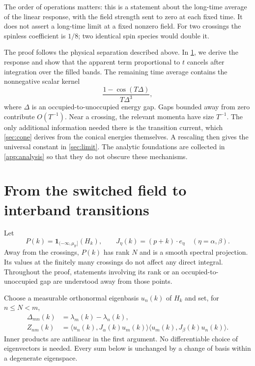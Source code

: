\documentclass[11pt,a4paper]{article}
\newcommand{\ind}{\mathbf 1}
\theoremstyle{remark}
\numberwithin{equation}{section}
\begin{document}
The order of operations matters: this is a statement about the long-time
average of the linear response, with the field strength sent to zero at
each fixed time. It does not assert a long-time limit at a fixed nonzero
field. For two crossings the spinless coefficient is $1/8$; two identical
spin species would double it.

The proof follows the physical separation described above.
In \cref{sec:response}, we derive the response and show that the apparent
term proportional to $t$ cancels after integration over the filled bands.
The remaining time average contains the nonnegative scalar kernel
\[
 \frac{1-\cos(T\Delta)}{T\Delta^3},
\]
where $\Delta$ is an occupied-to-unoccupied energy gap. Gaps bounded away
from zero contribute $O(T^{-1})$. Near a crossing, the relevant momenta
have size $T^{-1}$. The only additional information needed there is the
transition current, which \cref{sec:cone} derives from the conical
energies themselves. A rescaling then gives the universal constant in
\cref{sec:limit}. The analytic foundations are collected in
\cref{app:analysis} so that they do not obscure these mechanisms.

\section{From the switched field to interband transitions}
\label{sec:response}

Let
\[
 P(k)=\ind_{(-\infty,\mu_{\mathrm F}]}(H_k),\qquad
 J_\eta(k)=(p+k)\cdot e_\eta\quad(\eta=\alpha,\beta).
\]
Away from the crossings, $P(k)$ has rank $N$ and is a smooth spectral
projection. Its values at the finitely many crossings do not affect any
direct integral. Throughout the proof, statements involving its rank or
an occupied-to-unoccupied gap are understood away from those points.

Choose a measurable orthonormal eigenbasis $u_n(k)$ of $H_k$ and set, for
$n\leq N<m$,
\begin{equation}
 \begin{split}
 \Delta_{mn}(k)&=\lambda_m(k)-\lambda_n(k),\\
 Z_{nm}(k)&=
 \langle u_n(k),J_\alpha(k)u_m(k)\rangle
 \langle u_m(k),J_\beta(k)u_n(k)\rangle.
 \end{split}
 \label{eq:transition-data}
\end{equation}
Inner products are antilinear in the first argument. No differentiable
choice of eigenvectors is needed. Every sum below is unchanged by a
change of basis within a degenerate eigenspace.
\end{document}
